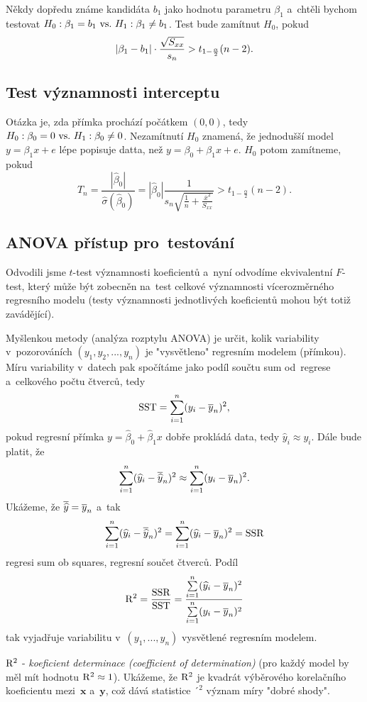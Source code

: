 \begin{remark}
	Někdy dopředu známe kandidáta $b_1$ jako hodnotu parametru $\beta_1$ a~chtěli bychom testovat 
	$H_0: \beta_1=b_1 ~\text{vs.}~ H_1: \beta_1\neq b_1$. Test bude zamítnut $H_0$, pokud 
	$$ \left|\beta_1-b_1\right|\cdot \frac{\sqrt{S_{xx}}}{s_n}> t_{1-\frac{\alpha}{2}}(n-2). $$
\end{remark}
\subsection{Test významnosti interceptu}
Otázka je, zda přímka prochází počátkem $(0,0)$, tedy $H_0: \beta_0=0 ~\text{vs.}~ H_1: \beta_0\neq0$. Nezamítnutí $H_0$ znamená, že jednodušší model $y=\beta_1 x+e$ lépe popisuje datta, než $y=\beta_0+\beta_1 x+e$. $H_0$ potom zamítneme, pokud
$$ T_n=\frac{|\widehat{\beta}_0|}{\widehat{\sigma}(\widehat{\beta}_0)}=|\widehat{\beta}_0|\frac{1}{s_n\sqrt{\frac{1}{n}+\frac{\overline{x}^2}{S_{xx}}}}>t_{1-\frac{\alpha}{2}}(n-2). $$

\subsection{ANOVA přístup pro~testování}
Odvodili jsme $t$-test významnosti koeficientů a~nyní odvodíme ekvivalentní $F$-test, který může být zobecněn na~test celkové významnosti vícerozměrného regresního modelu (testy významnosti jednotlivých koeficientů mohou být totiž zavádějící). 

Myšlenkou metody (analýza rozptylu ANOVA) je určit, kolik variability v~pozorováních $(y_1,y_2,...,y_n)$ je "vysvětleno" regresním modelem (přímkou). Míru variability v~datech pak spočítáme jako podíl součtu sum od~regrese a~celkového počtu čtverců, tedy
$$ \mathrm{SST}=\sum_{i=1}^{n}(y_i-\overline{y}_n)^2, $$
pokud regresní přímka $y=\widehat{\beta}_0+\widehat{\beta}_1 x$ dobře prokládá data, tedy $\widehat{y}_i\approx y_i$. Dále bude platit, že 
$$ \sum\limits_{i=1}^{n} (\widehat{y}_i-\overline{\widehat{y}}_n)^2\approx\sum\limits_{i=1}^{n} (y_i-\overline{y}_n)^2. $$
Ukážeme, že $\overline{\widehat{y}}=\overline{y}_n$ a~tak 
$$ \sum\limits_{i=1}^{n}(\widehat{y}_i-\overline{\widehat{y}}_n)^2=\sum\limits_{i=1}^{n} (\widehat{y}_i-\overline{y}_n)^2=\mathrm{SSR} $$ regresi sum ob squares, regresní součet čtverců. Podíl
$$ \mathrm{R}^2=\frac{\mathrm{SSR}}{\mathrm{SST}}=\frac{\sum\limits_{i=1}^{n} (\widehat{y}_i-\overline{y}_n)^2}{\sum\limits_{i=1}^{n} (y_i-\overline{y}_n)^2}$$ tak vyjadřuje variabilitu v~$(y_1,...,y_n)$ vysvětlené regresním modelem. 

$\mathrm{R}^2$ - \textit{koeficient determinace (coefficient of determination)} (pro každý model by měl mít hodnotu $\mathrm{R}^2\approx1$). Ukážeme, že $\mathrm{R}^2$ je kvadrát výběrového korelačního koeficientu mezi~$\textbf{x}$ a~$\textbf{y}$, což dává statistice $´^2$ význam míry "dobré shody". 

